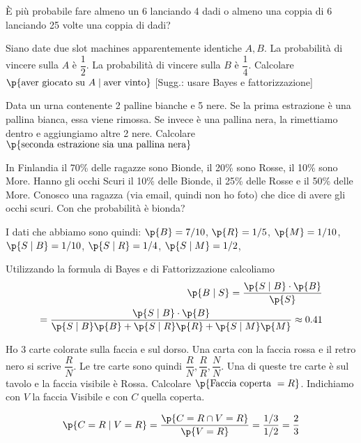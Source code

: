 
\begin{exrc}
	\`E pi\`u probabile fare almeno un 6 lanciando 4 dadi o almeno una coppia di 6 lanciando 25 volte una coppia di dadi?
\end{exrc}

\begin{exrc}
	Siano date due slot machines apparentemente identiche $ A,B $. La probabilit\`a  di vincere sulla $ A $ \`e $\dfrac{1}{2}$. La probabilit\`a  di vincere sulla $ B $ \`e $ \dfrac{1}{4}$. Calcolare $ \p{\text{aver giocato su }A \mid \text{aver vinto}} $ [Sugg.: usare Bayes e fattorizzazione]
\end{exrc}

\begin{exrc}
    Data un urna contenente 2 palline bianche e 5 nere. Se la prima estrazione \`e una pallina bianca, essa viene rimossa. Se invece \`e una pallina nera, la rimettiamo dentro e aggiungiamo altre 2 nere. Calcolare $ \p{\text{seconda estrazione sia una pallina nera}} $
\end{exrc}

\begin{exrc}
    In Finlandia il 70\% delle ragazze sono Bionde, il 20\% sono Rosse, il 10\% sono More. Hanno gli occhi Scuri il 10\% delle Bionde, il 25\% delle Rosse e il 50\% delle More.
    Conosco una ragazza (via email, quindi non ho foto) che dice di avere gli occhi scuri. Con che probabilit\`a  \`e bionda?

    I dati che abbiamo sono quindi: $\p{B}=7/10$,  $\p{R}=1/5$,  $\p{M}=1/10$,
    $\p{S \mid B}=1/10$,  $\p{S \mid R}=1/4$,  $\p{S \mid M}=1/2$,

    Utilizzando la formula di Bayes e di Fattorizzazione calcoliamo
    \begin{equation*}
    \begin{aligned}
    \p{B \mid S} = \dfrac{\p{S \mid B} \cdot \p{B}}{\p{S}} \\
	= \dfrac{\p{S \mid B} \cdot \p{B}}{\p{S \mid B} \p{B} + \p{S \mid R} \p{R} + \p{S \mid M} \p{M}} \approx 0.41
    \end{aligned}
    \end{equation*}
\end{exrc}

\begin{exrc}
    Ho 3 carte colorate sulla faccia e sul dorso. Una carta con la faccia rossa e il retro nero si scrive $ \dfrac{R}{N} $. Le tre carte sono quindi $ \dfrac{R}{N}, \dfrac{R}{R}, \dfrac{N}{N} $.
	Una di queste tre carte  \`e  sul tavolo e la faccia visibile \`e Rossa. Calcolare $ \p{\text{Faccia coperta } = R} $. Indichiamo con $ V $ la faccia Visibile e con $ C $ quella coperta.

    \begin{equation*}
    \begin{aligned}
    \p{C = R \mid V = R} = \dfrac{\p{C = R \cap V = R}}{\p{V = R}} = \dfrac{1/3}{1/2} = \dfrac{2}{3}
    \end{aligned} 
    \end{equation*}
\end{exrc}



